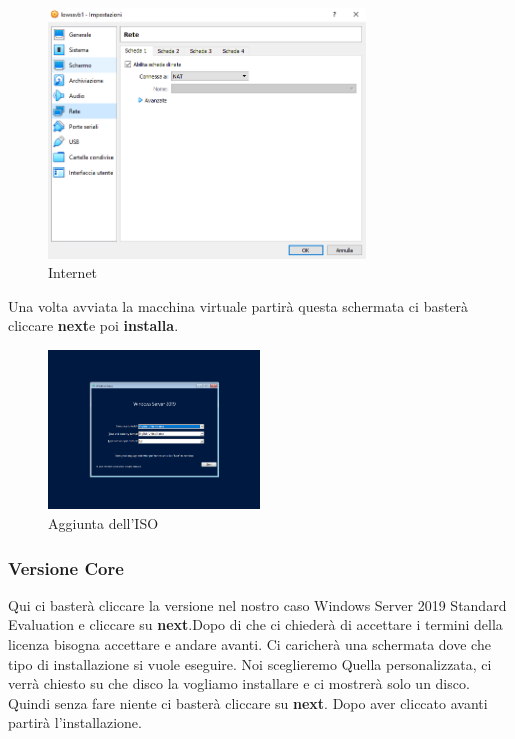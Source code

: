 \documentclass[../main.tex]{subfiles}
\begin{document}
\begin{figure}[h]
    \centering
    \includegraphics[width=0.75\textwidth]{Images/set-up7.PNG}
    \caption{Internet}
\end{figure}

Una volta avviata la macchina virtuale partirà questa schermata ci basterà cliccare \textbf{next}e poi \textbf{installa}.

\begin{figure}[h]
    \centering
    \includegraphics[width=0.5\textwidth]{Images/conf1en.PNG}
    \caption{Aggiunta dell'ISO}
\end{figure}

\pagebreak{}
\thispagestyle{header-pages}

\subsubsection{Versione Core}
Qui ci basterà cliccare la versione nel nostro caso Windows Server 2019 Standard Evaluation e cliccare su \textbf{next}.Dopo di che ci chiederà di accettare i termini della licenza bisogna accettare e andare avanti. Ci caricherà una schermata dove che tipo di installazione si vuole eseguire. Noi sceglieremo Quella personalizzata, ci verrà chiesto su che disco la vogliamo installare e ci mostrerà solo un disco. Quindi senza fare niente ci basterà cliccare su \textbf{next}. Dopo aver cliccato avanti partirà l'installazione. 
\end{document}

